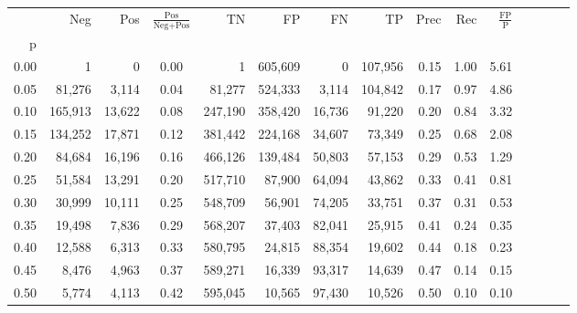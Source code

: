 \begin{tabular}{rrrcrrrrrrrrrrr}
\toprule
{} &      Neg &     Pos & $\frac{\text{Pos}}{\text{Neg}+\text{Pos}}$ &       TN &       FP &       FN &       TP &  Prec &   Rec & $\frac{\text{FP}}{\text{P}}$ \\
p    &          &         &                                            &          &          &          &          &       &       &                              \\
\midrule
0.00 &        1 &       0 &                                       0.00 &        1 &  605,609 &        0 &  107,956 &  0.15 &  1.00 &                         5.61 \\
0.05 &   81,276 &   3,114 &                                       0.04 &   81,277 &  524,333 &    3,114 &  104,842 &  0.17 &  0.97 &                         4.86 \\
0.10 &  165,913 &  13,622 &                                       0.08 &  247,190 &  358,420 &   16,736 &   91,220 &  0.20 &  0.84 &                         3.32 \\
0.15 &  134,252 &  17,871 &                                       0.12 &  381,442 &  224,168 &   34,607 &   73,349 &  0.25 &  0.68 &                         2.08 \\
0.20 &   84,684 &  16,196 &                                       0.16 &  466,126 &  139,484 &   50,803 &   57,153 &  0.29 &  0.53 &                         1.29 \\
0.25 &   51,584 &  13,291 &                                       0.20 &  517,710 &   87,900 &   64,094 &   43,862 &  0.33 &  0.41 &                         0.81 \\
0.30 &   30,999 &  10,111 &                                       0.25 &  548,709 &   56,901 &   74,205 &   33,751 &  0.37 &  0.31 &                         0.53 \\
0.35 &   19,498 &   7,836 &                                       0.29 &  568,207 &   37,403 &   82,041 &   25,915 &  0.41 &  0.24 &                         0.35 \\
0.40 &   12,588 &   6,313 &                                       0.33 &  580,795 &   24,815 &   88,354 &   19,602 &  0.44 &  0.18 &                         0.23 \\
0.45 &    8,476 &   4,963 &                                       0.37 &  589,271 &   16,339 &   93,317 &   14,639 &  0.47 &  0.14 &                         0.15 \\
0.50 &    5,774 &   4,113 &                                       0.42 &  595,045 &   10,565 &   97,430 &   10,526 &  0.50 &  0.10 &                         0.10 \\

\end{tabular}
